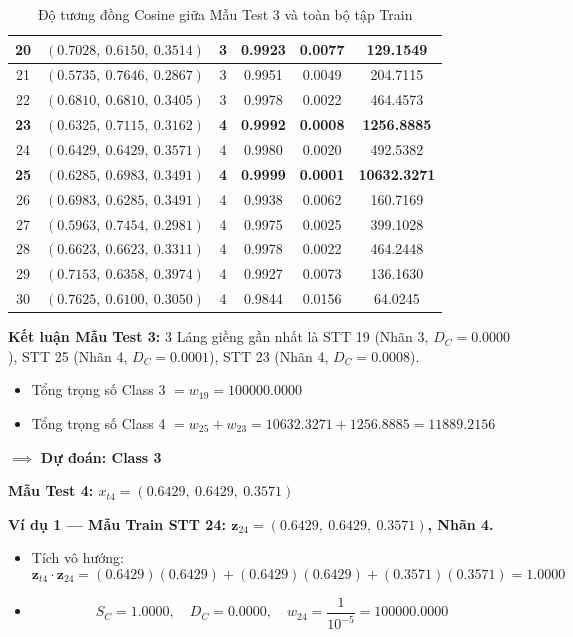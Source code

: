 \documentclass[12pt,a4paper]{article}
\begin{document}
\begin{table}[H]
{\begin{tabular}{|c|c|c|c|c|c|}
20 & $(0.7028,\ 0.6150,\ 0.3514)$ & 3 & 0.9923 & 0.0077 & 129.1549 \\ \hline
21 & $(0.5735,\ 0.7646,\ 0.2867)$ & 3 & 0.9951 & 0.0049 & 204.7115 \\ \hline
22 & $(0.6810,\ 0.6810,\ 0.3405)$ & 3 & 0.9978 & 0.0022 & 464.4573 \\ \hline
\textbf{23} & \textbf{$(0.6325,\ 0.7115,\ 0.3162)$} & \textbf{4} & \textbf{0.9992} & \textbf{0.0008} & \textbf{1256.8885} \\ \hline
24 & $(0.6429,\ 0.6429,\ 0.3571)$ & 4 & 0.9980 & 0.0020 & 492.5382 \\ \hline
\textbf{25} & \textbf{$(0.6285,\ 0.6983,\ 0.3491)$} & \textbf{4} & \textbf{0.9999} & \textbf{0.0001} & \textbf{10632.3271} \\ \hline
26 & $(0.6983,\ 0.6285,\ 0.3491)$ & 4 & 0.9938 & 0.0062 & 160.7169 \\ \hline
27 & $(0.5963,\ 0.7454,\ 0.2981)$ & 4 & 0.9975 & 0.0025 & 399.1028 \\ \hline
28 & $(0.6623,\ 0.6623,\ 0.3311)$ & 4 & 0.9978 & 0.0022 & 464.2448 \\ \hline
29 & $(0.7153,\ 0.6358,\ 0.3974)$ & 4 & 0.9927 & 0.0073 & 136.1630 \\ \hline
30 & $(0.7625,\ 0.6100,\ 0.3050)$ & 4 & 0.9844 & 0.0156 & 64.0245 \\ \hline
\end{tabular}%
}
\caption{Độ tương đồng Cosine giữa Mẫu Test 3 và toàn bộ tập Train}
\end{table}
 
\textbf{Kết luận Mẫu Test 3:} 3 Láng giềng gần nhất là STT 19 (Nhãn 3, $D_C=0.0000$), STT 25 (Nhãn 4, $D_C=0.0001$), STT 23 (Nhãn 4, $D_C=0.0008$).
\begin{itemize}
    \item Tổng trọng số Class 3 $= w_{19} = 100000.0000$
    \item Tổng trọng số Class 4 $= w_{25} + w_{23} = 10632.3271 + 1256.8885 = 11889.2156$
\end{itemize}
$\implies$ \textbf{Dự đoán: Class 3}
 
\vspace{0.5cm}
 
\textbf{Mẫu Test 4: $x_{t4} = (0.6429,\ 0.6429,\ 0.3571)$}
 
\vspace{0.3cm}
\textbf{Ví dụ 1 — Mẫu Train STT 24: $\mathbf{z}_{24} = (0.6429,\ 0.6429,\ 0.3571)$, Nhãn 4.}
\begin{itemize}
    \item Tích vô hướng:
    \[
        \mathbf{z}_{t4} \cdot \mathbf{z}_{24}
        = (0.6429)(0.6429) + (0.6429)(0.6429) + (0.3571)(0.3571) = 1.0000
    \]
    \item
    \[
        S_C = 1.0000, \quad D_C = 0.0000, \quad
        w_{24} = \frac{1}{10^{-5}} = 100000.0000
    \]
\end{itemize}
 
\end{document}
